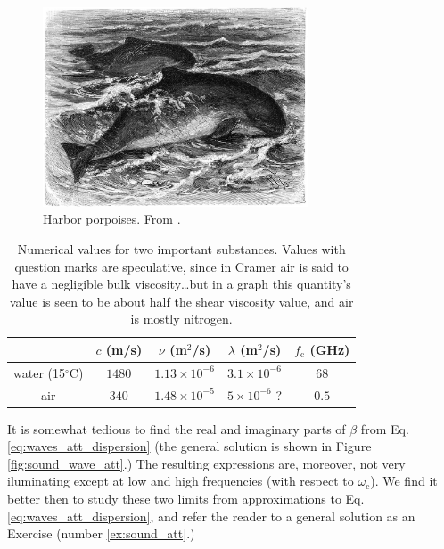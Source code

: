 \begin{figure}
  \begin{center}
    \includegraphics[width=0.7\textwidth]{figures/porpoises}
  \end{center}
  \caption{Harbor porpoises. From \cite{Brehms_Tierleben}.  \label{fig:porpoises}}
\end{figure}


\begin{table}
\begin{tabular}{|c|c|c|c|c|}
  \hline
    & $ c$ (m/s) &  $ \nu$ (m$^2$/s) & $\lambda$ (m$^2$/s) & $ f_\mathrm{c}$ (GHz)\\
  \hline
  \hline
  water (15$^\circ$C) & $1480$& $ 1.13 \times 10^{-6}$ & $ 3.1 \times 10^{-6}$ & $68$ \\
  \hline
  air & $340$   & $ 1.48\times 10^{-5}$ & $ 5 \times 10^{-6}$ ? & $0.5$ \\
  \hline
\end{tabular}
\caption{Numerical values for two important substances. Values with
  question marks are speculative, since in Cramer\cite{Cramer} air is
  said to have a negligible bulk viscosity\ldots but in a graph this
  quantity's value is seen to be about half the shear viscosity value,
  and air is mostly nitrogen.
 \label{tbl:sound_att}}
\end{table}

It is somewhat tedious to find the real and imaginary parts of $\beta$
from Eq. \ref{eq:waves_att_dispersion} (the general solution is shown
in Figure \ref{fig:sound_wave_att}.)  The resulting expressions are,
moreover, not very iluminating except at low and high frequencies
(with respect to $\omega_\mathrm{c}$). We find it better then to study
these two limits from approximations to
Eq. \ref{eq:waves_att_dispersion}, and refer the reader to a general
solution as an Exercise (number \ref{ex:sound_att}.)


